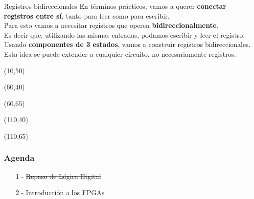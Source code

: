 \documentclass[aspectratio=169]{beamer}
\begin{document}
\begin{frame}[t]{Registros bidireccionales}
    \small En términos prácticos, vamos a querer \textbf{conectar registros entre sí}, tanto para leer como para escribir.\\
    \vspace{0.2cm}
    Para esto vamos a necesitar registros que operen \textbf{bidireccionalmente}.\\ Es decir que, utilizando las mismas entradas, podamos escribir y leer el registro.\\
    \vspace{0.2cm}
    Usando \textbf{componentes de 3 estados}, vamos a construir registros bidireccionales.\\
    Esta idea se puede extender a cualquier circuito, no necesariamente registros.\\
    \vspace{0.4cm}
    \begin{textblock}{65}(10,50)  \end{textblock}
    \begin{textblock}{65}(60,40)  \end{textblock}
    \begin{textblock}{65}(60,65)  \end{textblock}
    \begin{textblock}{35}(110,40)
     \end{textblock}
    \begin{textblock}{35}(110,65)
     \end{textblock}
\end{frame}

\begin{frame}[fragile]
    \frametitle{Agenda}
    \Large
    \begin{enumerate}
    \setlength\itemsep{1cm}
    \item[\LARGE 1 - ] \sout{Repaso de Lógica Digital}
    \item[\LARGE 2 - ] Introducción a los FPGAs
    \end{enumerate}
\end{frame}
\end{document}
